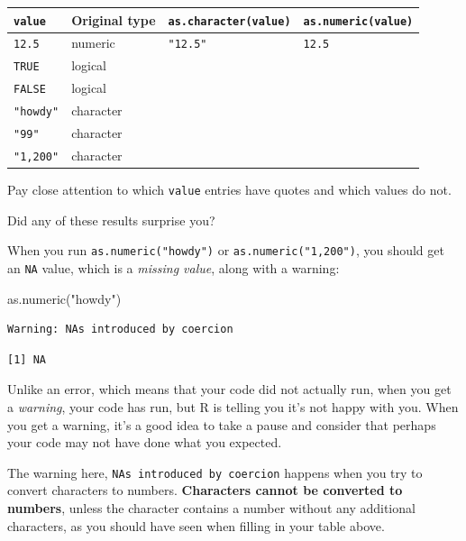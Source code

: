 \documentclass[
  letterpaper,
  DIV=11,
  numbers=noendperiod]{scrreprt}
\newenvironment{Shaded}{\begin{snugshade}}{\end{snugshade}}
\newcommand{\FunctionTok}[1]{\textcolor[rgb]{0.28,0.35,0.67}{#1}}
\newcommand{\NormalTok}[1]{\textcolor[rgb]{0.00,0.23,0.31}{#1}}
\newcommand{\StringTok}[1]{\textcolor[rgb]{0.13,0.47,0.30}{#1}}
\begin{document}
\begin{longtable}[]{@{}llll@{}}
\toprule\noalign{}
\texttt{value} & Original type & \texttt{as.character(value)} &
\texttt{as.numeric(value)} \\
\midrule\noalign{}
\endhead
\bottomrule\noalign{}
\endlastfoot
\texttt{12.5} & numeric & \texttt{"12.5"} & \texttt{12.5} \\
\texttt{TRUE} & logical & & \\
\texttt{FALSE} & logical & & \\
\texttt{"howdy"} & character & & \\
\texttt{"99"} & character & & \\
\texttt{"1,200"} & character & & \\
\end{longtable}

Pay close attention to which \texttt{value} entries have quotes and
which values do not.

Did any of these results surprise you?

When you run \texttt{as.numeric("howdy")} or
\texttt{as.numeric("1,200")}, you should get an \texttt{NA} value, which
is a \emph{missing value}, along with a warning:

\begin{Shaded}
\begin{Highlighting}[]
\FunctionTok{as.numeric}\NormalTok{(}\StringTok{"howdy"}\NormalTok{)}
\end{Highlighting}
\end{Shaded}

\begin{verbatim}
Warning: NAs introduced by coercion
\end{verbatim}

\begin{verbatim}
[1] NA
\end{verbatim}

Unlike an error, which means that your code did not actually run, when
you get a \emph{warning}, your code has run, but R is telling you it's
not happy with you. When you get a warning, it's a good idea to take a
pause and consider that perhaps your code may not have done what you
expected.

The warning here, \texttt{NAs\ introduced\ by\ coercion} happens when
you try to convert characters to numbers. \textbf{Characters cannot be
converted to numbers}, unless the character contains a number without
any additional characters, as you should have seen when filling in your
table above.
\end{document}
